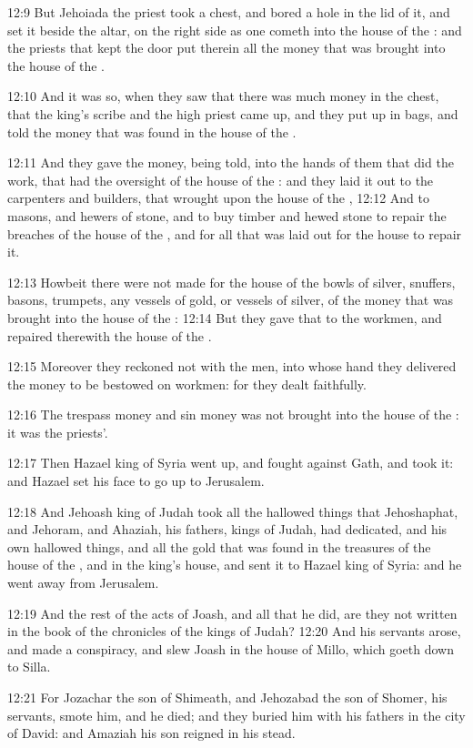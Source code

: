 12:9 But Jehoiada the priest took a chest, and bored a hole in the lid
of it, and set it beside the altar, on the right side as one cometh
into the house of the \LORD: and the priests that kept the door put
therein all the money that was brought into the house of the \LORD.

12:10 And it was so, when they saw that there was much money in the
chest, that the king's scribe and the high priest came up, and they
put up in bags, and told the money that was found in the house of the
\LORD.

12:11 And they gave the money, being told, into the hands of them that
did the work, that had the oversight of the house of the \LORD: and
they laid it out to the carpenters and builders, that wrought upon the
house of the \LORD, 12:12 And to masons, and hewers of stone, and to
buy timber and hewed stone to repair the breaches of the house of the
\LORD, and for all that was laid out for the house to repair it.

12:13 Howbeit there were not made for the house of the \LORD bowls of
silver, snuffers, basons, trumpets, any vessels of gold, or vessels of
silver, of the money that was brought into the house of the \LORD:
12:14 But they gave that to the workmen, and repaired therewith the
house of the \LORD.

12:15 Moreover they reckoned not with the men, into whose hand they
delivered the money to be bestowed on workmen: for they dealt
faithfully.

12:16 The trespass money and sin money was not brought into the house
of the \LORD: it was the priests'.

12:17 Then Hazael king of Syria went up, and fought against Gath, and
took it: and Hazael set his face to go up to Jerusalem.

12:18 And Jehoash king of Judah took all the hallowed things that
Jehoshaphat, and Jehoram, and Ahaziah, his fathers, kings of Judah,
had dedicated, and his own hallowed things, and all the gold that was
found in the treasures of the house of the \LORD, and in the king's
house, and sent it to Hazael king of Syria: and he went away from
Jerusalem.

12:19 And the rest of the acts of Joash, and all that he did, are they
not written in the book of the chronicles of the kings of Judah?
12:20 And his servants arose, and made a conspiracy, and slew Joash in
the house of Millo, which goeth down to Silla.

12:21 For Jozachar the son of Shimeath, and Jehozabad the son of
Shomer, his servants, smote him, and he died; and they buried him with
his fathers in the city of David: and Amaziah his son reigned in his
stead.


